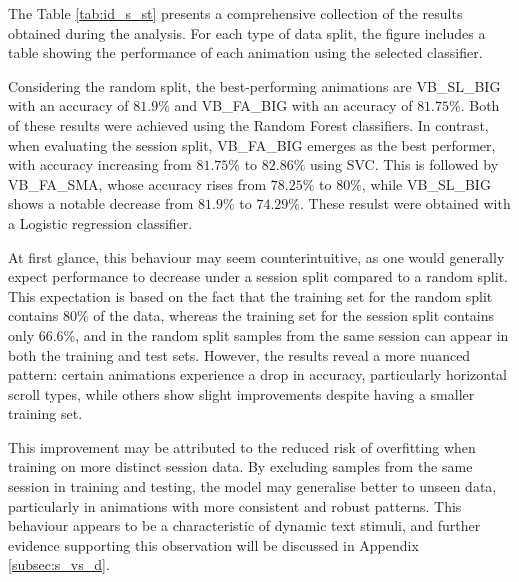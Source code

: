\documentclass[12pt]{report}
\begin{document}
The Table \ref{tab:id_s_st} presents a comprehensive collection of the results obtained during the analysis. 
For each type of data split, the figure includes a table showing the performance of each animation using the selected classifier.

Considering the random split, the best-performing animations are VB\_SL\_BIG with an accuracy of $81.9\%$ and VB\_FA\_BIG with an accuracy of $81.75\%$.
Both of these results were achieved using the Random Forest classifiers. 
In contrast, when evaluating the session split, VB\_FA\_BIG emerges as the best performer, with accuracy increasing from $81.75\%$ to $82.86\%$ using SVC. 
This is followed by VB\_FA\_SMA, whose accuracy rises from $78.25\%$ to $80\%$, while VB\_SL\_BIG shows a notable decrease from $81.9\%$ to $74.29\%$.
These resulst were obtained with a Logistic regression classifier.

At first glance, this behaviour may seem counterintuitive, as one would generally expect performance to decrease under a session split compared to a random split. 
This expectation is based on the fact that the training set for the random split contains 80\% of the data, whereas the training set for the session split contains only 66.6\%, and in the random split samples from the same session can appear in both the training and test sets. 
However, the results reveal a more nuanced pattern: certain animations experience a drop in accuracy, particularly horizontal scroll types, while others show slight improvements despite having a smaller training set.

This improvement may be attributed to the reduced risk of overfitting when training on more distinct session data. 
By excluding samples from the same session in training and testing, the model may generalise better to unseen data, particularly in animations with more consistent and robust patterns. 
This behaviour appears to be a characteristic of dynamic text stimuli, and further evidence supporting this observation will be discussed in Appendix \ref{subsec:s_vs_d}.
\end{document}
